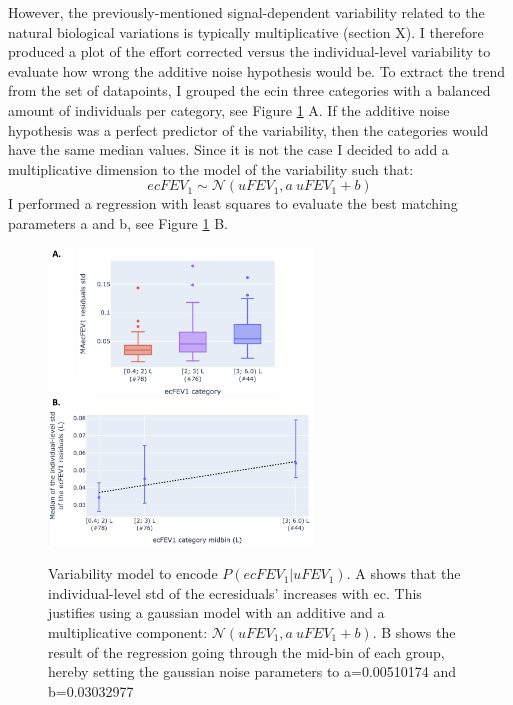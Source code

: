 However, the previously-mentioned signal-dependent variability related to the natural biological variations is typically multiplicative (section X). I therefore produced a plot of the effort corrected \F versus the individual-level variability to evaluate how wrong the additive noise hypothesis would be. To extract the trend from the set of datapoints, I grouped the ec\F in three categories with a balanced amount of individuals per category, see Figure \ref{fig:fev1_noise_model} A. If the additive noise hypothesis was a perfect predictor of the variability, then the categories would have the same median values. Since it is not the case I decided to add a multiplicative dimension to the model of the \F variability such that:
\begin{equation}
    ecF\!EV_1 \sim \mathcal{N}(uF\!EV_1, a\ uF\!EV_1 + b)
\end{equation}
I performed a regression with least squares to evaluate the best matching parameters a and b, see Figure \ref{fig:fev1_noise_model} B. 

\begin{figure}[!h]
    \caption{Variability model to encode $P(ecF\!EV_1 | uF\!EV_1)$.  A shows that the individual-level std of the ec\F residuals' increases with ec\F. This justifies using a gaussian model with an additive and a multiplicative component: $\mathcal{N}(uF\!EV_1, a\ uF\!EV_1 + b)$. B shows the result of the regression going through the mid-bin of each group, hereby setting the gaussian noise parameters to a=0.00510174 and b=0.03032977}
    \centering
    \includegraphics[width=70mm]{Chapter1/Figs/fev1_noise_model.png}
    \label{fig:fev1_noise_model}
\end{figure}


